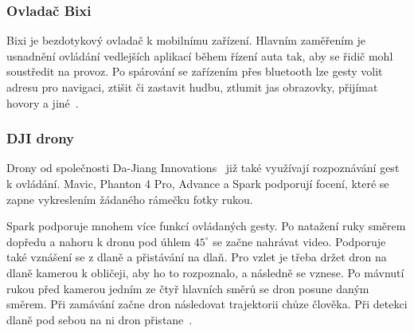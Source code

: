 \subsubsection{Ovladač Bixi}
Bixi je bezdotykový ovladač k mobilnímu zařízení. Hlavním zaměřením je usnadnění ovládání vedlejších aplikací během řízení auta tak, aby se řidič mohl soustředit na provoz. Po spárování se zařízením přes bluetooth lze gesty volit adresu pro navigaci, ztišit či zastavit hudbu, ztlumit jas obrazovky, přijímat hovory a jiné~\cite{bixi}.

\subsubsection{DJI drony}
Drony od společnosti Da-Jiang Innovations~\cite{dji} již také využívají rozpoznávání gest k ovládání. Mavic, Phanton 4 Pro, Advance  a Spark podporují focení, které se zapne vykreslením žádaného rámečku fotky rukou.

Spark podporuje mnohem více funkcí ovládaných gesty. Po natažení ruky směrem dopředu a nahoru k dronu pod úhlem $ 45^\circ $ se začne nahrávat video. Podporuje také vznášení se z dlaně a přistávání na dlaň. Pro vzlet je třeba držet dron na dlaně kamerou k obličeji, aby ho to rozpoznalo, a následně se vznese. Po mávnutí rukou před kamerou jedním ze čtyř hlavních směrů se dron posune daným směrem. Při zamávání začne dron následovat trajektorii chůze člověka. Při detekci dlaně pod sebou na ni dron přistane~\cite{heliguy}.

\endinput
